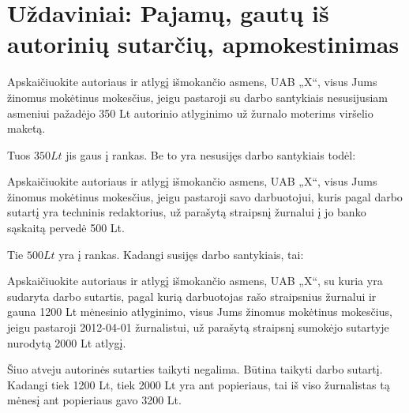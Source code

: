 \chapter{Uždaviniai: Pajamų, gautų iš autorinių sutarčių, apmokestinimas}

\begin{tasks}

  \begin{task}
    \begin{condition}
      Apskaičiuokite autoriaus ir atlygį išmokančio asmens, UAB „X“,
      visus Jums žinomus mokėtinus mokesčius, jeigu pastaroji su
      darbo santykiais nesusijusiam asmeniui pažadėjo 350 Lt autorinio
      atlyginimo už žurnalo moterims viršelio maketą.
    \end{condition}
    \begin{solution}
      Tuos $350 Lt$ jis gaus į rankas. Be to yra nesusijęs darbo
      santykiais todėl:


    \end{solution}
  \end{task}

  \begin{task}
    \begin{condition}
      Apskaičiuokite autoriaus ir atlygį išmokančio asmens, UAB „X“, visus
      Jums žinomus mokėtinus mokesčius, jeigu pastaroji savo darbuotojui,
      kuris pagal darbo sutartį yra techninis redaktorius, už
      parašytą straipsnį žurnalui į jo banko sąskaitą pervedė 500 Lt.
    \end{condition}
    \begin{solution}
      Tie $500 Lt$ yra į rankas. Kadangi susijęs darbo santykiais, tai:
      

    \end{solution}
  \end{task}

  \begin{task}
    \begin{condition}
      Apskaičiuokite autoriaus ir atlygį išmokančio asmens, UAB „X“, su
      kuria yra sudaryta darbo sutartis, pagal kurią darbuotojas rašo
      straipsnius žurnalui ir gauna 1200 Lt mėnesinio atlyginimo,
      visus Jums žinomus mokėtinus mokesčius, jeigu pastaroji 2012-04-01
      žurnalistui, už parašytą straipsnį sumokėjo sutartyje nurodytą
      2000 Lt atlygį.
    \end{condition}
    \begin{solution}
      Šiuo atveju autorinės sutarties taikyti negalima. Būtina
      taikyti darbo sutartį. Kadangi tiek 1200 Lt, tiek 2000 Lt
      yra ant popieriaus, tai iš viso žurnalistas tą mėnesį
      ant popieriaus gavo 3200 Lt.


\end{solution}
\end{task}
\end{tasks}
